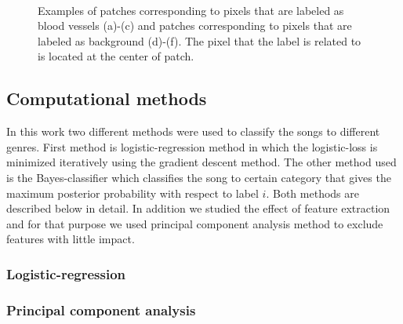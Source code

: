 \documentclass[aps,prb,10pt,twocolumn,groupedaddress]{revtex4-1}
\begin{document}
\begin{figure}[!t]
\begin{subfigure}[]{0.3\textwidth}
    	\caption{}
    \end{subfigure}\\
	\caption{Examples of patches corresponding to pixels that are labeled as blood vessels (a)-(c) and patches corresponding to pixels that are labeled as background (d)-(f). The pixel that the label is related to is located at the center of patch.}
	\label{fig:example_patches}
\end{figure}


\subsection{Computational methods}
\label{sec:computational_methods}
In this work two different methods were used to classify the songs to different
genres. First method is logistic-regression method in which the logistic-loss
is minimized iteratively using the gradient descent method.
The other method used is the Bayes-classifier which classifies the song to
certain category that gives the maximum posterior probability with respect to
label $i$. Both methods are described below in detail. In addition we studied
the effect of feature extraction and for that purpose we used principal
component analysis method to exclude features with little impact. 
\subsubsection{Logistic-regression}

\subsubsection{Principal component analysis}
\end{document}
